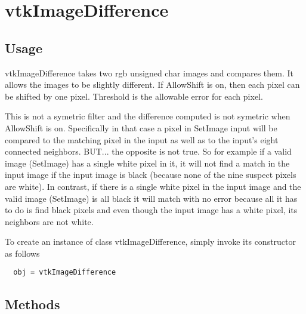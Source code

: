 \section{vtkImageDifference}

\subsection{Usage}

 vtkImageDifference takes two rgb unsigned char images and compares them.
 It allows the images to be slightly different.  If AllowShift is on,
 then each pixel can be shifted by one pixel. Threshold is the allowable
 error for each pixel.

 This is not a symetric filter and the difference computed is not symetric
 when AllowShift is on. Specifically in that case a pixel in SetImage input
 will be compared to the matching pixel in the input as well as to the
 input's eight connected neighbors. BUT... the opposite is not true. So for
 example if a valid image (SetImage) has a single white pixel in it, it
 will not find a match in the input image if the input image is black
 (because none of the nine suspect pixels are white). In contrast, if there
 is a single white pixel in the input image and the valid image (SetImage)
 is all black it will match with no error because all it has to do is find
 black pixels and even though the input image has a white pixel, its
 neighbors are not white.

To create an instance of class vtkImageDifference, simply
invoke its constructor as follows
\begin{verbatim}
  obj = vtkImageDifference
\end{verbatim}
\subsection{Methods}


